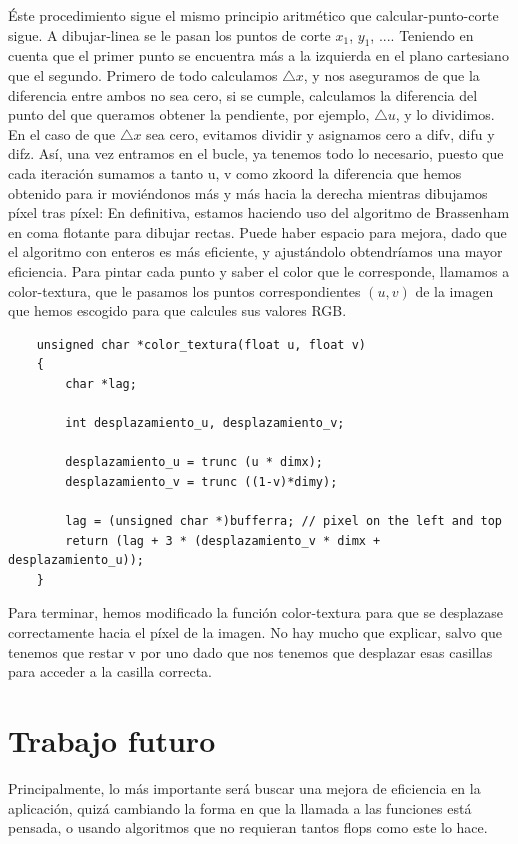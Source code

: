 \documentclass[12pt,a4paper]{article}
\begin{document}
Éste procedimiento sigue el mismo principio aritmético que calcular-punto-corte sigue. A dibujar-linea se le pasan los puntos de corte $x_1$, $y_1$, .... Teniendo en cuenta que el primer punto se encuentra más a la izquierda en el plano cartesiano que el segundo. Primero de todo calculamos $\bigtriangleup x$, y nos aseguramos de que la diferencia entre ambos no sea cero, si se cumple, calculamos la diferencia del punto del que queramos obtener la pendiente, por ejemplo, $\bigtriangleup u$, y lo dividimos. En el caso de que $\bigtriangleup x$ sea cero, evitamos dividir y asignamos cero a difv, difu y difz. Así, una vez entramos en el bucle, ya tenemos todo lo necesario, puesto que cada iteración sumamos a tanto u, v como zkoord la diferencia que hemos obtenido para ir moviéndonos más y más hacia la derecha mientras dibujamos píxel tras píxel: En definitiva, estamos haciendo uso del algoritmo de Brassenham en coma flotante para dibujar rectas. Puede haber espacio para mejora, dado que el algoritmo con enteros es más eficiente, y ajustándolo obtendríamos una mayor eficiencia. 
Para pintar cada punto y saber el color que le corresponde, llamamos a color-textura, que le pasamos los puntos correspondientes $(u,v)$  de la imagen que hemos escogido para que calcules sus valores RGB.
\begin{lstlisting}
	unsigned char *color_textura(float u, float v)
	{
		char *lag;
		
		int desplazamiento_u, desplazamiento_v;
		
		desplazamiento_u = trunc (u * dimx);
		desplazamiento_v = trunc ((1-v)*dimy);
		
		lag = (unsigned char *)bufferra; // pixel on the left and top
		return (lag + 3 * (desplazamiento_v * dimx + desplazamiento_u));
	}
\end{lstlisting}
Para terminar, hemos modificado la función color-textura para que se desplazase correctamente hacia el píxel de la imagen. No hay mucho que explicar, salvo que tenemos que restar v por uno dado que nos tenemos que desplazar esas casillas para acceder a la casilla correcta.
\section{Trabajo futuro}
Principalmente, lo más importante será buscar una mejora de eficiencia en la aplicación, quizá cambiando la forma en que la llamada a las funciones está pensada, o usando algoritmos que no requieran tantos flops como este lo hace. 
\end{document}
